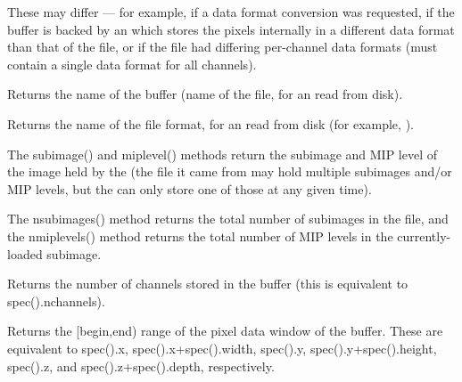 These may differ --- for example, if a data format conversion was
requested, if the buffer is backed by an \ImageCache which stores the
pixels internally in a different data format than that of the file, or
if the file had differing per-channel data formats (\ImageBuf must
contain a single data format for all channels).
\apiend


Returns the name of the buffer (name of the file, for an
\ImageBuf read from disk).
\apiend

Returns the name of the file format, for an \ImageBuf read from disk
(for example, ).
\apiend

The {\cf subimage()} and {\cf miplevel()} methods return the subimage and MIP
level of the image held by the \ImageBuf (the file it came from may hold
multiple subimages and/or MIP levels, but the \ImageBuf can only store
one of those at any given time).

The {\cf nsubimages()} method returns the total number of subimages in
the file, and the {\cf nmiplevels()} method returns the total number
of MIP levels in the currently-loaded subimage.
\apiend

Returns the number of channels stored in the buffer (this is equivalent
to {\cf spec().nchannels}).
\apiend

Returns the {\cf [begin,end)} range of the pixel data window of the
buffer.  These are equivalent to {\cf spec().x}, {\cf spec().x+spec().width},
{\cf spec().y}, {\cf spec().y+spec().height},
{\cf spec().z}, and {\cf spec().z+spec().depth}, respectively.
\apiend


